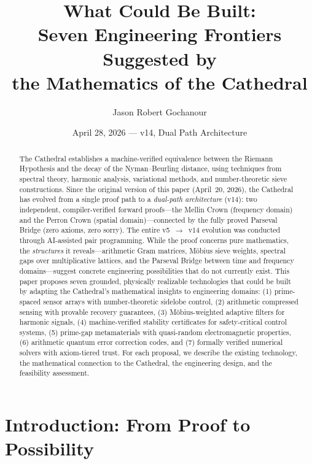 \documentclass[11pt,a4paper]{article}
\title{%
  What Could Be Built:\\
  Seven Engineering Frontiers Suggested by\\
  the Mathematics of the Cathedral%
}
\author{
  Jason Robert Gochanour
}
\date{April 28, 2026 --- v14, Dual Path Architecture}
\begin{document}
\maketitle

\begin{abstract}
The Cathedral establishes a machine-verified equivalence between
the Riemann Hypothesis and the decay of the Nyman--Beurling
distance, using techniques from spectral theory, harmonic analysis,
variational methods, and number-theoretic sieve constructions.
Since the original version of this paper (April~20, 2026), the
Cathedral has evolved from a single proof path to a \emph{dual-path
architecture} (v14): two independent, compiler-verified forward
proofs---the Mellin Crown (frequency domain) and the Perron Crown
(spatial domain)---connected by the fully proved Parseval Bridge
(zero axioms, zero sorry). The entire v5~$\to$~v14 evolution was
conducted through AI-assisted pair programming.
While the proof concerns pure mathematics, the
\emph{structures} it reveals---arithmetic Gram matrices, M\"obius
sieve weights, spectral gaps over multiplicative lattices, and the
Parseval Bridge between time and frequency domains---suggest
concrete engineering possibilities that do not currently exist.
This paper proposes seven grounded, physically realizable
technologies that could be built by adapting the Cathedral's
mathematical insights to engineering domains: (1) prime-spaced
sensor arrays with number-theoretic sidelobe control, (2) arithmetic
compressed sensing with provable recovery guarantees,
(3) M\"obius-weighted adaptive filters for harmonic signals,
(4) machine-verified stability certificates for safety-critical
control systems, (5) prime-gap metamaterials with quasi-random
electromagnetic properties, (6) arithmetic quantum error correction
codes, and (7) formally verified numerical solvers with axiom-tiered
trust. For each proposal, we describe the existing technology, the
mathematical connection to the Cathedral, the engineering design,
and the feasibility assessment.
\end{abstract}

\tableofcontents

\section{Introduction: From Proof to Possibility}
\end{document}
